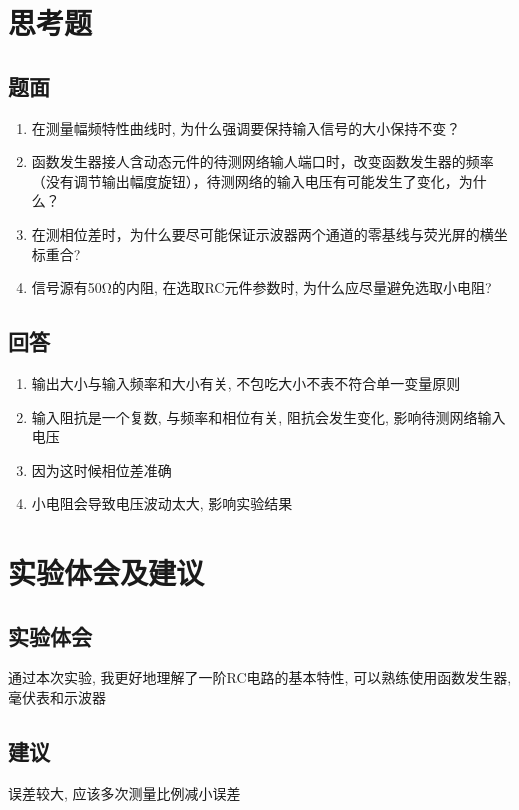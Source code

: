 \documentclass[10pt, a4paper]{article} %
\begin{document}
\newpage

\section{思考题}
\subsection{题面}
\begin{enumerate}[leftmargin=50pt,label=(\arabic*)] %
    \item 在测量幅频特性曲线时, 为什么强调要保持输入信号的大小保持不变？
    \item 函数发生器接人含动态元件的待测网络输人端口时，改变函数发生器的频率（没有调节输出幅度旋钮），待测网络的输入电压有可能发生了变化，为什么？
    \item 在测相位差时，为什么要尽可能保证示波器两个通道的零基线与荧光屏的横坐标重合?
    \item 信号源有50Ω的内阻, 在选取RC元件参数时, 为什么应尽量避免选取小电阻?
\end{enumerate}
\subsection{回答}

\begin{enumerate}[leftmargin=50pt,label=(\arabic*)] %
    \item 输出大小与输入频率和大小有关, 不包吃大小不表不符合单一变量原则
    \item 输入阻抗是一个复数, 与频率和相位有关, 阻抗会发生变化, 影响待测网络输入电压
    \item 因为这时候相位差准确
    \item 小电阻会导致电压波动太大, 影响实验结果
\end{enumerate}

\section{实验体会及建议}
\subsection{实验体会}
通过本次实验, 我更好地理解了一阶RC电路的基本特性, 可以熟练使用函数发生器, 毫伏表和示波器
\subsection{建议}
误差较大, 应该多次测量比例减小误差
\end{document}
